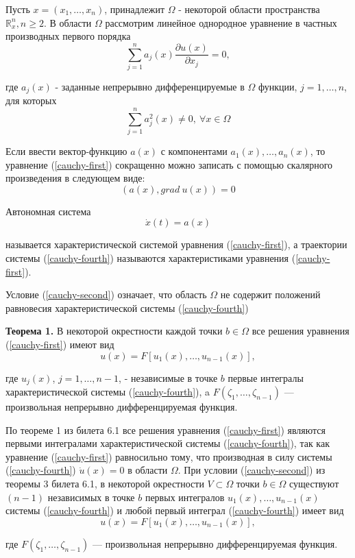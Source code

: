 \par Пусть $x=(x_1, \ldots, x_n)$, принадлежит $\Omega$ - некоторой области пространства $\mathbb{R}_x^n, n \geqslant 2$. В области $\Omega$ рассмотрим линейное однородное уравнение в
частных производных первого порядка
\begin{equation}\label{cauchy-first}
    \sum_{j=1}^n a_j(x) \frac{\partial u(x)}{\partial x_j}=0,
\end{equation}
\par где $a_j(x)$ - заданные непрерывно дифференцируемые в $\Omega$ функции, $j=1, \ldots, n$, для которых
\begin{equation}\label{cauchy-second}
    \sum_{j=1}^n a_j^2(x) \neq 0, \: \forall x \in \Omega
\end{equation}

\par Если ввести вектор-функцию $a(x)$ с компонентами $a_1(x), \ldots, a_n(x)$, то уравнение (\ref{cauchy-first}) сокращенно можно записать с помощью скалярного произведения в следующем виде:
\begin{equation}\label{cauchy-third}
    (a(x), grad \: u(x))=0
\end{equation}

\par \Def Автономная система 
\begin{equation}\label{cauchy-fourth}
    \dot{x}(t)=a(x)
\end{equation}
\par называется характеристической системой уравнения (\ref{cauchy-first}), а траектории системы (\ref{cauchy-fourth}) называются характеристиками уравнения (\ref{cauchy-first}).

\par \Note Условие (\ref{cauchy-second}) означает, что область $\Omega$ не содержит положений равновесия характеристической системы (\ref{cauchy-fourth})

\par \textbf{Теорема 1.} В некоторой окрестности каждой точки $b \in \Omega$ все решения уравнения (\ref{cauchy-first}) имеют вид 
$$u(x)=F[u_1(x), \ldots, u_{n-1}(x)],$$
\par где $u_j(x)$, $j=1, \ldots, n-1$, - независимые в точке $b$ первые интегралы характеристической системы (\ref{cauchy-fourth}), a $F(\zeta_1, \ldots, \zeta_{n-1})$ — произвольная непрерывно дифференцируемая функция.

\par \Proof По теореме 1 из билета 6.1 все решения уравнения (\ref{cauchy-first}) являются первыми интегралами характеристической системы (\ref{cauchy-fourth}), так как уравнение (\ref{cauchy-first}) равносильно тому, что производная в силу системы (\ref{cauchy-fourth}) $\dot{u}(x)=0$ в области $\Omega$. При условии (\ref{cauchy-second}) из теоремы 3 билета 6.1, в некоторой
окрестности $V \subset \Omega$ точки $b \in \Omega$ существуют $(n-1)$ независимых в точке $b$ первых интегралов $u_1(x), \ldots, u_{n-1}(x)$ системы (\ref{cauchy-fourth}) и любой первый
интеграл (\ref{cauchy-fourth}) имеет вид
$$u(x)=F[u_1(x), \ldots, u_{n-1}(x)],$$
\par где $F(\zeta_1, \ldots, \zeta_{n-1})$ — произвольная непрерывно дифференцируемая функция. \EndProof

